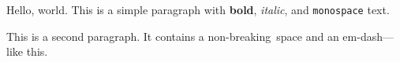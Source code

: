 \documentclass{article}
\begin{document}
Hello, world. This is a simple paragraph with \textbf{bold},
\textit{italic}, and \texttt{monospace} text.

This is a second paragraph. It contains a non-breaking~space
and an em-dash---like this.
\end{document}
